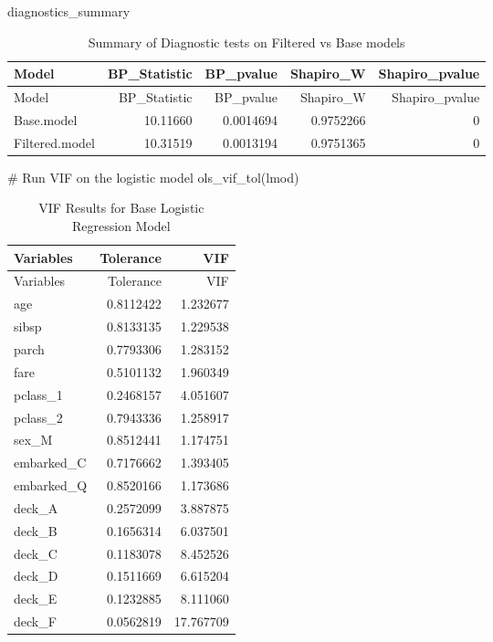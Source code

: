 \documentclass[
  letterpaper,
  DIV=11,
  numbers=noendperiod]{scrartcl}
\newenvironment{Shaded}{\begin{snugshade}}{\end{snugshade}}
\newcommand{\CommentTok}[1]{\textcolor[rgb]{0.37,0.37,0.37}{#1}}
\newcommand{\FunctionTok}[1]{\textcolor[rgb]{0.28,0.35,0.67}{#1}}
\newcommand{\NormalTok}[1]{\textcolor[rgb]{0.00,0.23,0.31}{#1}}
\begin{document}
\begin{Shaded}
\begin{Highlighting}[]
\NormalTok{diagnostics\_summary}
\end{Highlighting}
\end{Shaded}

\begin{longtable}[]{@{}lrrrr@{}}
\caption{Summary of Diagnostic tests on Filtered vs Base
models}\tabularnewline
\toprule\noalign{}
Model & BP\_Statistic & BP\_pvalue & Shapiro\_W & Shapiro\_pvalue \\
\midrule\noalign{}
\endfirsthead
\toprule\noalign{}
Model & BP\_Statistic & BP\_pvalue & Shapiro\_W & Shapiro\_pvalue \\
\midrule\noalign{}
\endhead
\bottomrule\noalign{}
\endlastfoot
Base.model & 10.11660 & 0.0014694 & 0.9752266 & 0 \\
Filtered.model & 10.31519 & 0.0013194 & 0.9751365 & 0 \\
\end{longtable}

\begin{Shaded}
\begin{Highlighting}[]
\CommentTok{\# Run VIF on the logistic model}
\FunctionTok{ols\_vif\_tol}\NormalTok{(lmod)}
\end{Highlighting}
\end{Shaded}

\begin{longtable}[]{@{}lrr@{}}
\caption{VIF Results for Base Logistic Regression Model}\tabularnewline
\toprule\noalign{}
Variables & Tolerance & VIF \\
\midrule\noalign{}
\endfirsthead
\toprule\noalign{}
Variables & Tolerance & VIF \\
\midrule\noalign{}
\endhead
\bottomrule\noalign{}
\endlastfoot
age & 0.8112422 & 1.232677 \\
sibsp & 0.8133135 & 1.229538 \\
parch & 0.7793306 & 1.283152 \\
fare & 0.5101132 & 1.960349 \\
pclass\_1 & 0.2468157 & 4.051607 \\
pclass\_2 & 0.7943336 & 1.258917 \\
sex\_M & 0.8512441 & 1.174751 \\
embarked\_C & 0.7176662 & 1.393405 \\
embarked\_Q & 0.8520166 & 1.173686 \\
deck\_A & 0.2572099 & 3.887875 \\
deck\_B & 0.1656314 & 6.037501 \\
deck\_C & 0.1183078 & 8.452526 \\
deck\_D & 0.1511669 & 6.615204 \\
deck\_E & 0.1232885 & 8.111060 \\
deck\_F & 0.0562819 & 17.767709 \\
\end{longtable}
\end{document}
